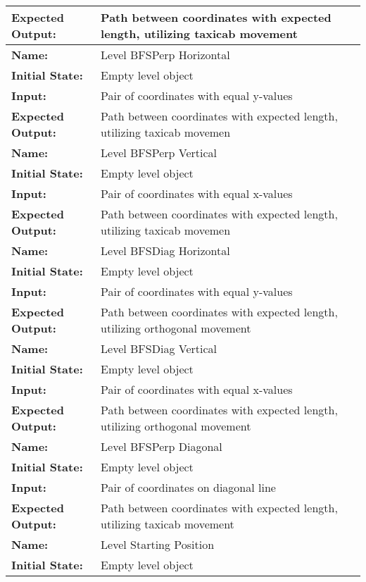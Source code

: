 \documentclass[12pt, titlepage]{article}
\begin{document}
\begin{center}
\begin{longtable}{ l | p{10cm} }
				\textbf{Expected Output:} & Path between coordinates with expected length, utilizing taxicab movement\\[0.6em]
				\hline
				\rule{0pt}{1.5em}\textbf{Name:} & Level BFSPerp Horizontal\\
				\textbf{Initial State:} & Empty level object\\
				\textbf{Input:} & Pair of coordinates with equal y-values\\
				\textbf{Expected Output:} & Path between coordinates with expected length, utilizing taxicab movemen\\[0.6em]
				\hline
				\rule{0pt}{1.5em}\textbf{Name:} & Level BFSPerp Vertical\\
				\textbf{Initial State:} & Empty level object\\
				\textbf{Input:} & Pair of coordinates with equal x-values\\
				\textbf{Expected Output:} & Path between coordinates with expected length, utilizing taxicab movemen\\[0.6em]
				\hline
				\rule{0pt}{1.5em}\textbf{Name:} & Level BFSDiag Horizontal\\
				\textbf{Initial State:} & Empty level object\\
				\textbf{Input:} & Pair of coordinates with equal y-values\\
				\textbf{Expected Output:} & Path between coordinates with expected length, utilizing orthogonal movement\\[0.6em]
				\hline
				\rule{0pt}{1.5em}\textbf{Name:} & Level BFSDiag Vertical\\
				\textbf{Initial State:} & Empty level object\\
				\textbf{Input:} & Pair of coordinates with equal x-values\\
				\textbf{Expected Output:} & Path between coordinates with expected length, utilizing orthogonal movement\\[0.6em]
				\hline
				\rule{0pt}{1.5em}\textbf{Name:} & Level BFSPerp Diagonal\\
				\textbf{Initial State:} & Empty level object\\
				\textbf{Input:} & Pair of coordinates on diagonal line\\
				\textbf{Expected Output:} & Path between coordinates with expected length, utilizing taxicab movement\\[0.6em]
				\hline
				\rule{0pt}{1.5em}\textbf{Name:} & Level Starting Position\\
				\textbf{Initial State:} & Empty level object\\

\end{longtable}
\end{center}
\end{document}
